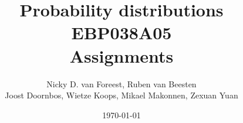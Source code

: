 \usepackage{../sources/preamble}
\usepackage{a4wide}


\setcounter{tocdepth}{1}
\usepackage{a4wide}
\usepackage{../sources/abbreviations}

\author{Nicky D. van Foreest, Ruben van Beesten \\
  Joost Doornbos, Wietze Koops, Mikael Makonnen, Zexuan Yuan
}
\date{\today}
\title{Probability distributions EBP038A05\\
Assignments}

